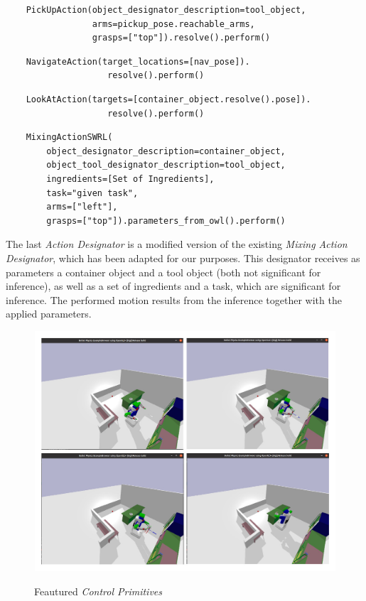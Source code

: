 \begin{lstlisting}
	PickUpAction(object_designator_description=tool_object,
                 arms=pickup_pose.reachable_arms,
                 grasps=["top"]).resolve().perform()
\end{lstlisting}

\begin{lstlisting}
	NavigateAction(target_locations=[nav_pose]).
					resolve().perform()
\end{lstlisting}

\begin{lstlisting}
	LookAtAction(targets=[container_object.resolve().pose]).
					resolve().perform()
\end{lstlisting}

\begin{lstlisting}
	MixingActionSWRL(
		object_designator_description=container_object,
        object_tool_designator_description=tool_object,
		ingredients=[Set of Ingredients],
        task="given task",
        arms=["left"],
        grasps=["top"]).parameters_from_owl().perform()
\end{lstlisting}

The last \textit{Action Designator} is a modified version of the existing \textit{Mixing Action Designator}, which has been adapted for our purposes. This designator receives as parameters a container object and a tool object (both not significant for inference), as well as a set of ingredients and a task, which are significant for inference. The performed motion results from the inference together with the applied parameters.

\begin{figure}[H]
    \includegraphics[scale=0.3]{Graphics/control_primitives.jpg}
    \label{fig:controlprimitives}
    \caption{Feautured \textit{Control Primitives}}
\end{figure}


